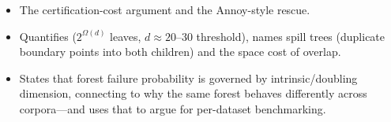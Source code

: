 \begin{interviewq}

\goodgreat
\begin{itemize}
    \item {} The certification-cost argument and the Annoy-style rescue.
    \item {} Quantifies ($2^{\Omega(d)}$ leaves, $d \approx 20$--$30$ threshold), names spill trees (duplicate boundary points into both children) and the space cost of overlap.
    \item {} States that forest failure probability is governed by intrinsic/doubling dimension, connecting to why the same forest behaves differently across corpora---and uses that to argue for per-dataset benchmarking.
\end{itemize}

\end{interviewq}


